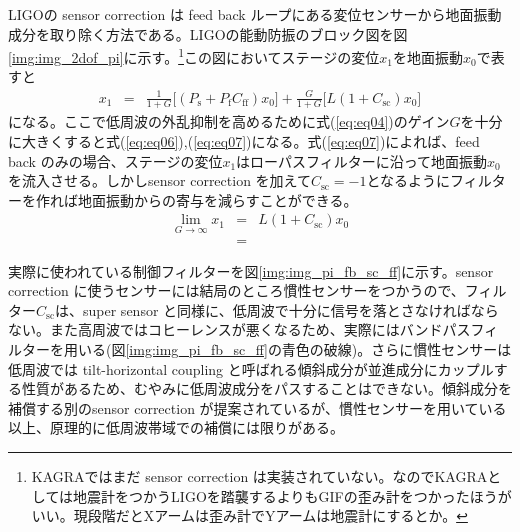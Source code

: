 LIGOの sensor correction は feed back ループにある変位センサーから地面振動成分を取り除く方法である。LIGOの能動防振のブロック図を図\ref{img:img_2dof_pi}に示す。\footnote{KAGRAではまだ sensor correction は実装されていない。なのでKAGRAとしては地震計をつかうLIGOを踏襲するよりもGIFの歪み計をつかったほうがいい。現段階だとXアームは歪み計でYアームは地震計にするとか。}この図においてステージの変位$x_1$を地面振動$x_0$で表すと
\begin{eqnarray} \label{eq:eq04}
  x_1 &=& \frac{1}{1+G}\Biggl[(P_{\mathrm{s}}+P_{\mathrm{f}}C_{\mathrm{ff}})x_0\Biggl]
  + \frac{G}{1+G}\Biggl[L(1+C_{\mathrm{sc}})x_0\Biggl]
\end{eqnarray}
になる。ここで低周波の外乱抑制を高めるために式(\ref{eq:eq04})のゲイン$G$を十分に大きくすると式(\ref{eq:eq06}),(\ref{eq:eq07})になる。式(\ref{eq:eq07})によれば、feed back のみの場合、ステージの変位$x_1$はローパスフィルターに沿って地面振動$x_0$を流入させる。しかしsensor correction を加えて$C_{\mathrm{sc}}=-1$となるようにフィルターを作れば地面振動からの寄与を減らすことができる。
\begin{eqnarray}\label{eq:eq06}
  \lim_{G \to \infty} x_{1} &=& L(1+C_{\mathrm{sc}})x_0 \\
  &=&
\end{eqnarray}

実際に使われている制御フィルターを図\ref{img:img_pi_fb_sc_ff}に示す。sensor correction に使うセンサーには結局のところ慣性センサーをつかうので、フィルター$C_{\mathrm{sc}}$は、super sensor と同様に、低周波で十分に信号を落とさなければならない。また高周波ではコヒーレンスが悪くなるため、実際にはバンドパスフィルターを用いる(図\ref{img:img_pi_fb_sc_ff}の青色の破線)。さらに慣性センサーは低周波では tilt-horizontal coupling と呼ばれる傾斜成分が並進成分にカップルする性質があるため、むやみに低周波成分をパスすることはできない。傾斜成分を補償する別のsensor correction が提案されているが\cite{biscansD2018}、慣性センサーを用いている以上、原理的に低周波帯域での補償には限りがある。


